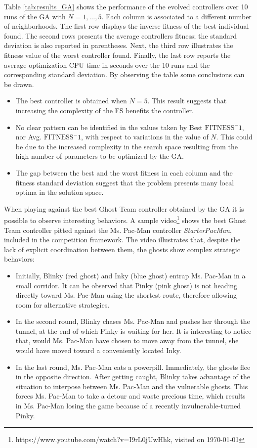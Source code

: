 \documentclass{llncs}
\begin{document}
Table \ref{tab:results_GA} shows the performance of the evolved controllers over 10 runs of the GA with $N=1,\ldots,5$. Each column is associated to a different number of neighborhoods. The first row displays the inverse fitness of the best individual found. The second rows presents the average controllers fitness; the standard deviation is also reported in parentheses. Next, the third row illustrates the fitness value of the worst controller found. Finally, the last row reports the average optimization CPU time in seconds over the 10 runs and the corresponding standard deviation. By observing the table some conclusions can be drawn.

\begin{itemize}
	\item The best controller is obtained when $N=5$. This result suggests that increasing the complexity of the FS benefits the controller.
	\item No clear pattern can be identified in the values taken by Best $\mathrm{FITNESS}^-1$, nor Avg. $\mathrm{FITNESS}^-1$, with respect to variations in the value of $N$. This could be due to the increased complexity in the search space resulting from the high number of parameters to be optimized by the GA.
	\item The gap between the best and the worst fitness in each column and the fitness standard deviation suggest that the problem presents many local optima in the solution space. 
\end{itemize}

When playing against the best Ghost Team controller obtained by the GA it is possible to observe interesting behaviors. A sample video\footnote{https://www.youtube.com/watch?v=I9rL0jUwHhk, visited on {\today}} shows the best Ghost Team controller pitted against the Ms. Pac-Man controller \textit{StarterPacMan}, included in the competition framework. The video illustrates that, despite the lack of explicit coordination between them, the ghosts show complex strategic behaviors:

\begin{itemize}
	\item Initially, Blinky (red ghost) and Inky (blue ghost) entrap Ms. Pac-Man in a small corridor. It can be observed that Pinky (pink ghost) is not heading directly toward Ms. Pac-Man using the shortest route, therefore allowing room for alternative strategies.
	\item In the second round, Blinky chases Ms. Pac-Man and pushes her through the tunnel, at the end of which Pinky is waiting for her. It is interesting to notice that, would Ms. Pac-Man have chosen to move away from the tunnel, she would have moved toward a conveniently located Inky.
	\item In the last round, Ms. Pac-Man eats a powerpill. Immediately, the ghosts flee in the opposite direction. After getting caught, Blinky takes advantage of the situation to interpose between Ms. Pac-Man and the vulnerable ghosts. This forces Ms. Pac-Man to take a detour and waste precious time, which results in Ms. Pac-Man losing the game because of a recently invulnerable-turned Pinky.
\end{itemize} 
\end{document}
